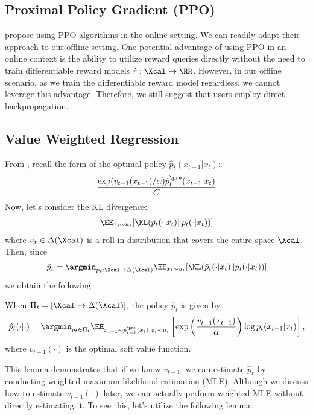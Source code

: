 \subsection{Proximal Policy Gradient (PPO) }

\citet{fan2023dpok,clark2023directly} propose using PPO algorithms in the online setting. We can readily adapt their approach to our offline setting. One potential advantage of using PPO in an online context is the ability to utilize reward queries directly without the need to train differentiable reward models $\hat r:\Xcal \to \RR$. However, in our offline scenario, as we train the differentiable reward model regardless, we cannot leverage this advantage. Therefore, we still suggest that users employ direct backpropagation.

\subsection{Value Weighted Regression}  

From , recall the form of the optimal policy $\hat p_t(x_{t-1}|x_t)$:
\begin{align*}
     \frac{\exp(v_{t-1}(x_{t-1})/\alpha)\hat p^{\pre}_{t}(x_{t-1}|x_{t})}{C}
\end{align*}
Now, let's consider the KL divergence:
\begin{align*}
    \EE_{x_t \sim u_t }[\KL (\hat{p}_t(\cdot|x_t) \|  p_t(\cdot|x_t))  ] 
\end{align*}
where $u_t \in \Delta(\Xcal)$ is a roll-in distribution that covers the entire space $\Xcal$. Then, since 
\begin{align*}
   \hat p_t =   \argmin_{p_t:\Xcal \to \Delta(\Xcal) } \EE_{x_t \sim u_t }[\KL (\hat{p}_t(\cdot|x_t) \|  p_t(\cdot|x_t))  ] 
\end{align*}
we obtain the following. 

\begin{lemma}\label{lem:value}
When $\Pi_t =[\Xcal \to \Delta(\Xcal)] $, the policy $\hat p_t$ is given by  
    \begin{align*}
 \hat p_t(\cdot|\cdot) = \argmin_{p_t \in \Pi_t} \EE_{x_{t-1}\sim p^{\pre}_{t-1}(x_{t}),x_t\sim u_t }\left[\exp\left( \frac{v_{t-1}(x_{t-1})}{\alpha}\right) \log p_t(x_{t-1}|x_t) \right ], 
\end{align*}
where $v_{t-1}(\cdot)$ is the optimal soft value function. 
\end{lemma}


This lemma demonstrates that if we know $v_{t-1}$, we can estimate $\hat p_t$ by conducting weighted maximum likelihood estimation (MLE). Although we discuss how to estimate $v_{t-1}(\cdot)$ later, we can actually perform weighted MLE without directly estimating it. To see this, let's utilize the following lemma:

